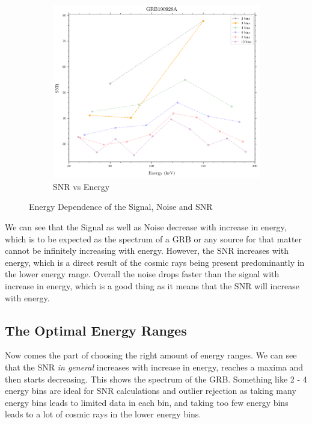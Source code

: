 \documentclass[11pt]{book} %
\begin{document}
\begin{figure}[H]
\begin{subfigure}[b]{0.3\textwidth}
    \end{subfigure}
    \begin{subfigure}[b]{0.3\textwidth}   
        \centering 
        \includegraphics[width=\textwidth]{Pictures/snrvsenergy.png}
        \caption{SNR vs Energy}
    \end{subfigure}
    \caption{Energy Dependence of the Signal, Noise and SNR}
\end{figure}


We can see that the Signal as well as Noise decrease with increase in energy, which is to be expected as the spectrum of a GRB or any source for that matter cannot be infinitely increasing with energy. However, the SNR increases with energy, which is a direct result of the cosmic rays being present predominantly in the lower energy range. Overall the noise drops faster than the signal with increase in energy, which is a good thing as it means that the SNR will increase with energy.

\subsection{The Optimal Energy Ranges}

Now comes the part of choosing the right amount of energy ranges. We can see that the SNR \textsl{in general} increases with increase in energy, reaches a maxima and then starts decreasing. This shows the spectrum of the GRB. Something like 2 - 4 energy bins are ideal for SNR calculations and outlier rejection as taking many energy bins leads to limited data in each bin, and taking too few energy bins leads to a lot of cosmic rays in the lower energy bins.
\end{document}
